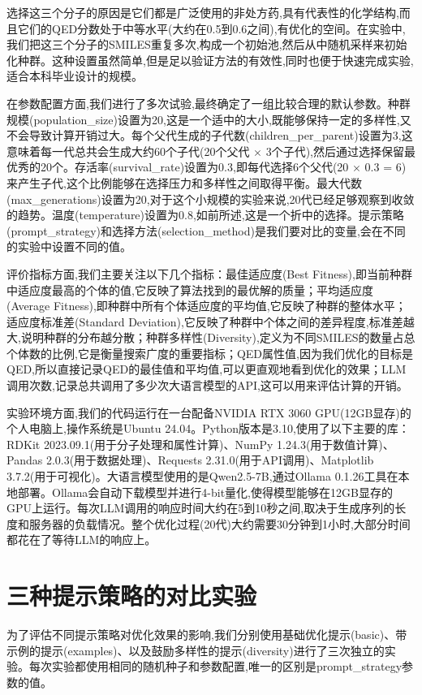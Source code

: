 选择这三个分子的原因是它们都是广泛使用的非处方药,具有代表性的化学结构,而且它们的QED分数处于中等水平(大约在0.5到0.6之间),有优化的空间。在实验中,我们把这三个分子的SMILES重复多次,构成一个初始池,然后从中随机采样来初始化种群。这种设置虽然简单,但是足以验证方法的有效性,同时也便于快速完成实验,适合本科毕业设计的规模。

在参数配置方面,我们进行了多次试验,最终确定了一组比较合理的默认参数。种群规模(population\_size)设置为20,这是一个适中的大小,既能够保持一定的多样性,又不会导致计算开销过大。每个父代生成的子代数(children\_per\_parent)设置为3,这意味着每一代总共会生成大约60个子代(20个父代 $\times$ 3个子代),然后通过选择保留最优秀的20个。存活率(survival\_rate)设置为0.3,即每代选择6个父代(20 $\times$ 0.3 = 6)来产生子代,这个比例能够在选择压力和多样性之间取得平衡。最大代数(max\_generations)设置为20,对于这个小规模的实验来说,20代已经足够观察到收敛的趋势。温度(temperature)设置为0.8,如前所述,这是一个折中的选择。提示策略(prompt\_strategy)和选择方法(selection\_method)是我们要对比的变量,会在不同的实验中设置不同的值。

评价指标方面,我们主要关注以下几个指标：最佳适应度(Best Fitness),即当前种群中适应度最高的个体的值,它反映了算法找到的最优解的质量；平均适应度(Average Fitness),即种群中所有个体适应度的平均值,它反映了种群的整体水平；适应度标准差(Standard Deviation),它反映了种群中个体之间的差异程度,标准差越大,说明种群的分布越分散；种群多样性(Diversity),定义为不同SMILES的数量占总个体数的比例,它是衡量搜索广度的重要指标；QED属性值,因为我们优化的目标是QED,所以直接记录QED的最佳值和平均值,可以更直观地看到优化的效果；LLM调用次数,记录总共调用了多少次大语言模型的API,这可以用来评估计算的开销。

实验环境方面,我们的代码运行在一台配备NVIDIA RTX 3060 GPU(12GB显存)的个人电脑上,操作系统是Ubuntu 24.04。Python版本是3.10,使用了以下主要的库：RDKit 2023.09.1(用于分子处理和属性计算)、NumPy 1.24.3(用于数值计算)、Pandas 2.0.3(用于数据处理)、Requests 2.31.0(用于API调用)、Matplotlib 3.7.2(用于可视化)。大语言模型使用的是Qwen2.5-7B,通过Ollama 0.1.26工具在本地部署。Ollama会自动下载模型并进行4-bit量化,使得模型能够在12GB显存的GPU上运行。每次LLM调用的响应时间大约在5到10秒之间,取决于生成序列的长度和服务器的负载情况。整个优化过程(20代)大约需要30分钟到1小时,大部分时间都花在了等待LLM的响应上。

\section{三种提示策略的对比实验}

为了评估不同提示策略对优化效果的影响,我们分别使用基础优化提示(basic)、带示例的提示(examples)、以及鼓励多样性的提示(diversity)进行了三次独立的实验。每次实验都使用相同的随机种子和参数配置,唯一的区别是prompt\_strategy参数的值。

